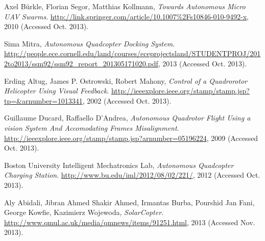   Axel B\"urkle, Florian Segor, Matthias Kollmann,
  \emph{Towards Autonomous Micro UAV Swarms}.
  \url{http://link.springer.com/article/10.1007%2Fs10846-010-9492-x},
  2010 (Accessed Oct. 2013).

  Sima Mitra,
  \emph{Autonomous Quadcopter Docking System}.
  \url{http://people.ece.cornell.edu/land/courses/eceprojectsland/STUDENTPROJ/2012to2013/ssm92/ssm92_report_201305171020.pdf},
   2013 (Accessed Oct. 2013).

  Erding Altug, James P. Ostrowski, Robert Mahony,
  \emph{Control of a Quadrorotor Helicopter Using Visual Feedback}.
  \url{http://ieeexplore.ieee.org/stamp/stamp.jsp?tp=&arnumber=1013341},
   2002 (Accessed Oct. 2013).

  Guillaume Ducard, Raffaello D'Andrea,
  \emph{Autonomous Quadrotor Flight Using a vision System And Accomodating Frames Misalignment}.
  \url{http://ieeexplore.ieee.org/stamp/stamp.jsp?arnumber=05196224},
   2009 (Accessed Oct. 2013).

  Boston University Intelligent Mechatronics Lab, 
  \emph{Autonomous Quadcopter Charging Station}.
  \url{http://www.bu.edu/iml/2012/08/02/221/}, 
  2012 (Accessed Oct. 2013).

Aly Abidali, Jibran Ahmed Shakir Ahmed, Irmantas Burba, Pourshid Jan Fani, George Kowfie, Kazimierz Wojewoda,
  \emph{SolarCopter}.
  \url{http://www.qmul.ac.uk/media/qmnews/items/91251.html}, 
  2013 (Accessed Nov. 2013).

\bibitem{} %